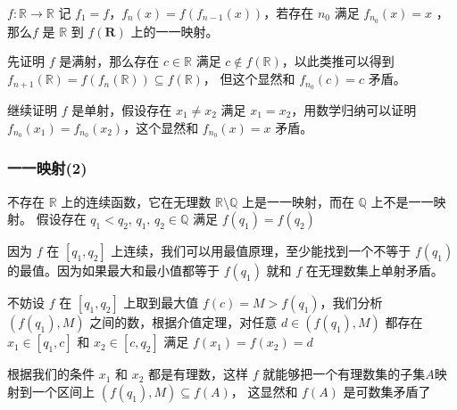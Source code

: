 \documentclass[12pt,a4paper]{ctexart}
\begin{document}
$f: \mathbb{R} \to \mathbb{R}$ 记 $f_1 = f$，$f_{n}(x) = f(f_{n-1}(x))$，若存在 $n_0$ 满足 $f_{n_0}(x) = x$ ，
那么$f$ 是 $\mathbb{R}$ 到 $f(\mathbf{R})$ 上的一一映射。

先证明 $f$ 是满射，那么存在 $c \in \mathbb{R}$ 满足 $c \notin f(\mathbb{R})$，以此类推可以得到 $f_{n+1}(\mathbb{R}) = f(f_{n}(\mathbb{R})) \subseteq f(\mathbb{R})$，
但这个显然和 $f_{n_0}(c) = c$ 矛盾。

继续证明 $f$ 是单射，假设存在 $x_1 \ne x_2$ 满足 $x_1 = x_2$，用数学归纳可以证明 $f_{n_0}(x_1)  = f_{n_0}(x_2)$，这个显然和 $f_{n_0}(x) = x$ 矛盾。


\subsubsection{一一映射(2)}

不存在 $\mathbb{R}$ 上的连续函数，它在无理数 $\mathbb{R} \setminus \mathbb{Q}$ 上是一一映射，而在 $\mathbb{Q}$ 上不是一一映射。
假设存在 $q_1 < q_2,\, q_1,\, q_2 \in \mathbb{Q}$ 满足 $f(q_1) = f(q_2)$

因为 $f$ 在 $[q_1, q_2]$ 上连续，我们可以用最值原理，至少能找到一个不等于 $f(q_1)$ 的最值。因为如果最大和最小值都等于 $f(q_1)$ 就和 $f$ 在无理数集上单射矛盾。

不妨设 $f$ 在 $[q_1, q_2]$ 上取到最大值 $f(c) = M > f(q_1)$，我们分析 $(f(q_1), M)$ 之间的数，根据介值定理，对任意 $d \in (f(q_1), M)$ 都存在
$x_1 \in [q_1, c]$ 和 $x_2 \in [c, q_2]$ 满足 $f(x_1) = f(x_2) = d$

根据我们的条件 $x_1$ 和 $x_2$ 都是有理数，这样 $f$ 就能够把一个有理数集的子集$A$映射到一个区间上 $(f(q_1), M) \subseteq f(A)$，
这显然和 $f(A)$ 是可数集矛盾了
\end{document}
